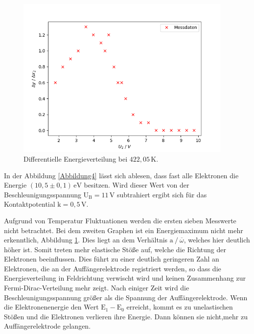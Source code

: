 \begin{figure}[H]
    \centering
    \includegraphics[height=80mm]{bilder/2.png}
    \caption{Differentielle Energieverteilung bei $422,05\,\unit{\kelvin}$.\label{Abbildung5} }
\end{figure}

\begin{flushleft}
    In der Abbildung \ref{Abbildung4} lässt sich ablesen, dass fast alle Elektronen die Energie $(10,5 \pm 0,1)\,\text{eV}$ besitzen. 
    Wird dieser Wert von der Beschleunigungsspannung $\text{U}_{\text{B}} = 11\,\unit{\volt}$ subtrahiert ergibt sich für das Kontaktpotential $\text{k} = 0,5\,\unit{\volt}$.
\end{flushleft}

\begin{flushleft}
    Aufgrund von Temperatur Fluktuationen werden die ersten sieben Messwerte nicht betrachtet. 
    Bei dem zweiten Graphen ist ein Energiemaximum nicht mehr erkenntlich, Abbildung \ref{Abbildung5}.
    Dies liegt an dem Verhältnis $\text{a} \mathbin{/} \overline{\omega}$, welches hier deutlich höher ist.
    Somit treten mehr elastische Stöße auf, welche die Richtung der Elektronen beeinflussen.
    Dies führt zu einer deutlich geringeren Zahl an Elektronen, die an der Auffängerelektrode registriert werden, so dass die Energieverteilung in Feldrichtung verwischt wird und keinen Zusammenhang zur Fermi-Dirac-Verteilung mehr zeigt.
    Nach einiger Zeit wird die Beschleunigungsspannung größer als die Spannung der Auffängerelektrode. 
    Wenn die Elektronenenergie den Wert $\text{E}_{1} - \text{E}_{0}$ erreicht, kommt es zu unelastischen Stößen und die Elektronen verlieren ihre Energie.
    Dann können sie nicht,mehr zu Auffängerelektrode gelangen.
\end{flushleft}

